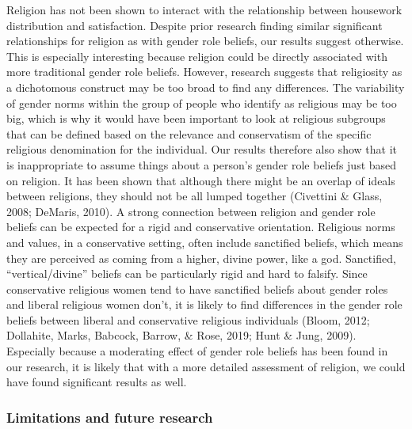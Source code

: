 \documentclass[
  man,floatsintext]{apa6}
\begin{document}
Religion has not been shown to interact with the relationship between housework distribution and satisfaction. Despite prior research finding similar significant relationships for religion as with gender role beliefs, our results suggest otherwise.
This is especially interesting because religion could be directly associated with more traditional gender role beliefs. However, research suggests that religiosity as a dichotomous construct may be too broad to find any differences. The variability of gender norms within the group of people who identify as religious may be too big, which is why it would have been important to look at religious subgroups that can be defined based on the relevance and conservatism of the specific religious denomination for the individual. Our results therefore also show that it is inappropriate to assume things about a person's gender role beliefs just based on religion. It has been shown that although there might be an overlap of ideals between religions, they should not be all lumped together (Civettini \& Glass, 2008; DeMaris, 2010).
A strong connection between religion and gender role beliefs can be expected for a rigid and conservative orientation. Religious norms and values, in a conservative setting, often include sanctified beliefs, which means they are perceived as coming from a higher, divine power, like a god. Sanctified, ``vertical/divine'' beliefs can be particularly rigid and hard to falsify. Since conservative religious women tend to have sanctified beliefs about gender roles and liberal religious women don't, it is likely to find differences in the gender role beliefs between liberal and conservative religious individuals (Bloom, 2012; Dollahite, Marks, Babcock, Barrow, \& Rose, 2019; Hunt \& Jung, 2009). Especially because a moderating effect of gender role beliefs has been found in our research, it is likely that with a more detailed assessment of religion, we could have found significant results as well.

\hypertarget{limitations-and-future-research}{%
\subsubsection{Limitations and future research}\label{limitations-and-future-research}}
\end{document}
